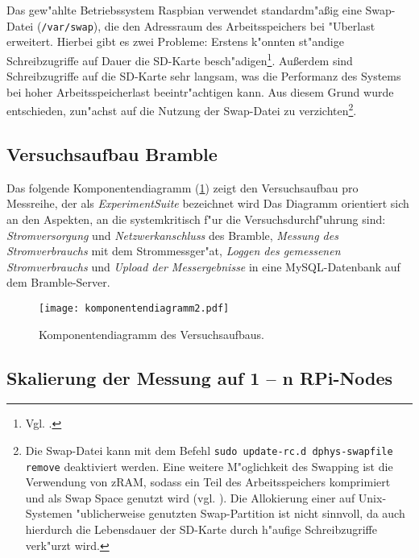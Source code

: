 Das gew"ahlte Betriebssystem Raspbian verwendet standardm"a\ss ig eine Swap-Datei (\verb+/var/swap+), die den Adressraum des Arbeitsspeichers bei "Uberlast erweitert. Hierbei gibt es zwei Probleme: Erstens k"onnten st"andige Schreibzugriffe auf Dauer die SD-Karte besch"adigen\footnote{Vgl. \cite{pow12}.}. Au\ss erdem sind Schreibzugriffe auf die SD-Karte sehr langsam, was die Performanz des Systems bei hoher Arbeitsspeicherlast beeintr"achtigen kann. Aus diesem Grund wurde entschieden, zun"achst auf die Nutzung der Swap-Datei zu verzichten\footnote{Die Swap-Datei kann mit dem Befehl \texttt{sudo update-rc.d dphys-swapfile remove} deaktiviert werden. Eine weitere M"oglichkeit des Swapping ist die Verwendung von zRAM, sodass ein Teil des Arbeitsspeichers komprimiert und als Swap Space genutzt wird (vgl. \cite{pow12}). Die Allokierung einer auf Unix-Systemen "ublicherweise genutzten Swap-Partition ist nicht sinnvoll, da auch hierdurch die Lebensdauer der SD-Karte durch h"aufige Schreibzugriffe verk"urzt wird.}.

\subsection{Versuchsaufbau Bramble}\label{Bramble-Versuchsaufbau}

Das folgende Komponentendiagramm (\ref{fig:Komponentendiagramm}) zeigt den Versuchsaufbau pro Messreihe, der als \textit{ExperimentSuite} bezeichnet wird Das Diagramm orientiert sich an den Aspekten, an die systemkritisch f"ur die Versuchsdurchf"uhrung sind: \textit{Stromversorgung} und \textit{Netzwerkanschluss} des Bramble, \textit{Messung des Stromverbrauchs} mit dem Strommessger"at, \textit{Loggen des gemessenen Stromverbrauchs} und \textit{Upload der Messergebnisse} in eine MySQL-Datenbank auf dem Bramble-Server. 
\begin{figure}[htb]
  \centering
  \texttt{[image: komponentendiagramm2.pdf]}\\ 
  \caption{Komponentendiagramm des Versuchsaufbaus.}
  \label{fig:Komponentendiagramm}		
\end{figure}

\subsection{Skalierung der Messung auf 1 -- n RPi-Nodes}

